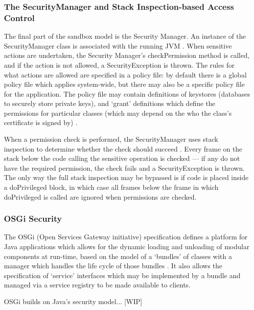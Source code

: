 \subsubsection{The SecurityManager and Stack Inspection-based Access Control}

The final part of the sandbox model is the Security Manager. An instance of the SecurityManager class is associated with the running JVM \cite{gosling2014java}. When sensitive actions are undertaken, the Security Manager's checkPermission method is called, and if the action is not allowed, a SecurityException is thrown. The rules for what actions are allowed are specified in a policy file: by default there is a global policy file which applies system-wide, but there may also be a specific policy file for the application. The policy file may contain definitions of keystores (databases to securely store private keys), and `grant' definitions which define the permissions for particular classes (which may depend on the who the class's certificate is signed by) \cite{gosling2014java}.

When a permission check is performed, the SecurityManager uses stack inspection to determine whether the check should succeed \cite{gong2003javasecurity}. Every frame on the stack below the code calling the sensitive operation is checked --- if any do not have the required permission, the check fails and a SecurityException is thrown. The only way the full stack inspection may be bypassed is if code is placed inside a doPrivileged block, in which case \cite{gong2003javasecurity} all frames below the frame in which doPrivileged is called are ignored when permissions are checked.


\subsubsection{OSGi Security}

The OSGi (Open Services Gateway initiative) specification defines a platform for Java applications which allows for the dynamic loading and unloading of modular components at run-time, based on the model of a `bundles' of classes with a manager which handles the life cycle of those bundles \cite{osgi2014osgi}. It also allows the specification of `service' interfaces which may be implemented by a bundle and managed via a service registry to be made available to clients.

OSGi builds on Java's security model... [WIP]

\cite{philippov2012security}